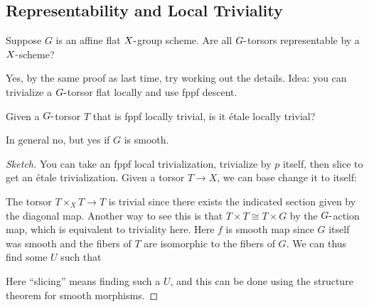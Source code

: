 \hypertarget{representability-and-local-triviality}{%
\subsection{Representability and Local
Triviality}\label{representability-and-local-triviality}}

\begin{question}

Suppose \(G\) is an affine flat \(X{\hbox{-}}\)group scheme. Are all
\(G{\hbox{-}}\)torsors representable by a \(X{\hbox{-}}\)scheme?

\end{question}

\begin{answer}

Yes, by the same proof as last time, try working out the details. Idea:
you can trivialize a \(G{\hbox{-}}\)torsor flat locally and use fppf
descent.

\end{answer}

\begin{question}

Given a \(G{\hbox{-}}\)torsor \(T\) that is fppf locally trivial, is it
étale locally trivial?

\end{question}

\begin{answer}

In general no, but yes if \(G\) is smooth.

\end{answer}

\begin{proof}[Sketch]

You can take an fppf local trivialization, trivialize by \(p\) itself,
then slice to get an étale trivialization. Given a torsor \(T\to X\), we
can base change it to itself:

The torsor \(T\times_X T\to T\) is trivial since there exists the
indicated section given by the diagonal map. Another way to see this is
that \(T\times T\cong T\times G\) by the \(G{\hbox{-}}\)action map,
which is equivalent to triviality here. Here \(f\) is smooth map since
\(G\) itself was smooth and the fibers of \(T\) are isomorphic to the
fibers of \(G\). We can thus find some \(U\) such that

Here ``slicing'' means finding such a \(U\), and this can be done using
the structure theorem for smooth morphisms.

\end{proof}

